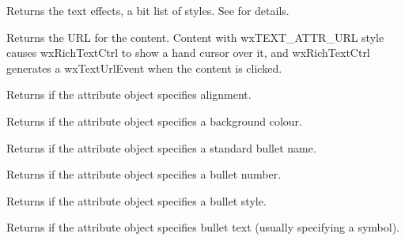 \label{wxtextattrgettexteffects}


Returns the text effects, a bit list of styles. See  for
details.

\label{wxtextattrgeturl}


Returns the URL for the content. Content with wxTEXT\_ATTR\_URL style
causes wxRichTextCtrl to show a hand cursor over it, and wxRichTextCtrl generates
a wxTextUrlEvent when the content is clicked.

\label{wxtextattrhasalignment}


Returns \true if the attribute object specifies alignment.

\label{wxtextattrhasbackgroundcolour}


Returns \true if the attribute object specifies a background colour.

\label{wxtextattrhasbulletname}


Returns \true if the attribute object specifies a standard bullet name.

\label{wxtextattrhasbulletnumber}


Returns \true if the attribute object specifies a bullet number.

\label{wxtextattrhasbulletstyle}


Returns \true if the attribute object specifies a bullet style.

\label{wxtextattrhasbullettext}


Returns \true if the attribute object specifies bullet text (usually specifying a symbol).

